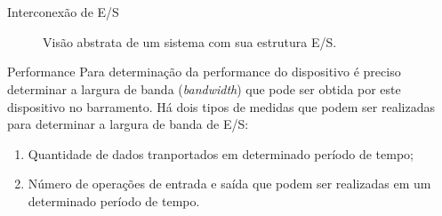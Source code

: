 
\lecturetitle{\insertlecture}{\course}

\section{\insertlecture}

\frame{\maketitle}


\begin{frame}{Interconexão de E/S}
\begin{figure}[h]
  \centering
  
  \caption{Visão abstrata de um sistema com sua estrutura E/S.}
  \label{fig:iointerconnect}
\end{figure}
\end{frame}

\begin{frame}{Performance}
  Para determinação da performance do dispositivo é preciso determinar a
  largura de banda ({\em bandwidth}) que pode ser obtida por este
  dispositivo no barramento. Há dois tipos de medidas que podem ser
  realizadas para determinar a largura de banda de E/S:

  \begin{enumerate}
  \item Quantidade de dados tranportados em determinado período de tempo;
  \item Número de operações de entrada e saída que podem ser realizadas
    em um determinado período de tempo.
  \end{enumerate}

\end{frame}

% 

